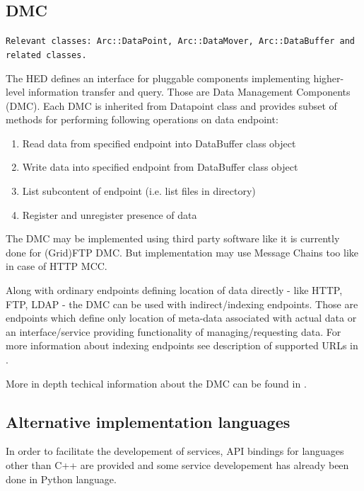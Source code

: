 \documentclass{book}
\begin{document}
\subsection{DMC}

\texttt{Relevant classes: Arc::DataPoint, Arc::DataMover, Arc::DataBuffer and related classes.}

The HED defines an interface for pluggable components implementing higher-level information transfer and query. Those are Data Management Components (DMC). Each DMC is inherited from Datapoint class and provides subset of methods for performing following operations on data endpoint:

\begin{enumerate}

\item Read data from specified endpoint into DataBuffer class object

\item Write data into specified endpoint from DataBuffer class object

\item List subcontent of endpoint (i.e. list files in directory)

\item Register and unregister presence of data

\end{enumerate}

The DMC may be implemented using third party software like it is currently done for (Grid)FTP DMC. But implementation may use Message Chains too like in case of HTTP MCC.

Along with ordinary endpoints defining location of data directly - like HTTP, FTP, LDAP - the DMC can be used with indirect/indexing endpoints. Those are endpoints which define only location of meta-data associated with actual data or an interface/service providing functionality of managing/requesting data. For more information about indexing endpoints see description of supported URLs in \cite{urls}.

More in depth techical information about the DMC can be found in \cite{dmc}.


\subsection{Alternative implementation languages}

In order to facilitate the developement of services, API bindings for languages other than C++ are provided and some service developement has already been done in Python language.
\end{document}
